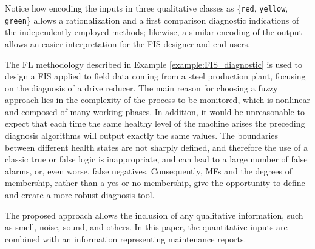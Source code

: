 Notice how encoding the inputs in three qualitative classes as \{\texttt{red}, \texttt{yellow}, \texttt{green}\} allows a rationalization and a first comparison  diagnostic indications of the independently employed methods; likewise, a similar encoding of the output allows an easier interpretation for the FIS designer and end users.

The FL methodology described in Example \ref{example:FIS_diagnostic} is used to design a FIS applied to field data coming from a steel production plant, focusing on the diagnosis of a drive reducer. 
%
The main reason for choosing a fuzzy approach lies in the complexity of the process to be monitored, which is nonlinear and composed of many working phases. In addition, it would be unreasonable to expect that each time the same healthy level of the machine arises  the preceding diagnosis algorithms will output exactly the same values. 
The boundaries between different health states are not sharply defined, and therefore the use of a classic true or false logic is inappropriate, and can lead to a large number of false alarms, or, even worse, false negatives. Consequently, MFs and the degrees of membership, rather than a yes or no membership, give the opportunity to define and create a more robust diagnosis tool.

\begin{remark}\label{rem: FL}
The proposed approach allows the inclusion of any qualitative information, such as smell, noise, sound, and others. In this paper, the quantitative inputs are combined with an information representing maintenance reports. 
\end{remark}








